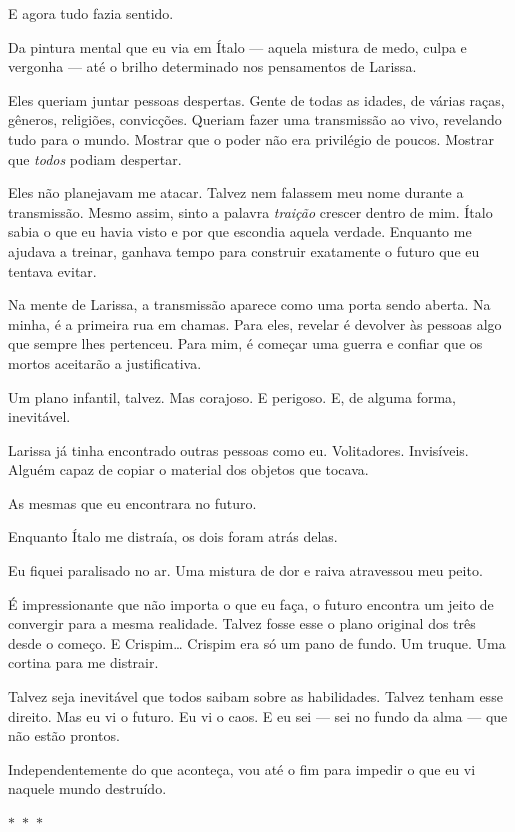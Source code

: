 E agora tudo fazia sentido.

Da pintura mental que eu via em Ítalo — aquela mistura de medo, culpa e vergonha — até o brilho determinado nos pensamentos de Larissa.

Eles queriam juntar pessoas despertas.  
Gente de todas as idades, de várias raças, gêneros, religiões, convicções.  
Queriam fazer uma transmissão ao vivo, revelando tudo para o mundo.  
Mostrar que o poder não era privilégio de poucos.  
Mostrar que \emph{todos} podiam despertar.

Eles não planejavam me atacar. Talvez nem falassem meu nome durante a transmissão. Mesmo assim, sinto a palavra \emph{traição} crescer dentro de mim. Ítalo sabia o que eu havia visto e por que escondia aquela verdade. Enquanto me ajudava a treinar, ganhava tempo para construir exatamente o futuro que eu tentava evitar.

Na mente de Larissa, a transmissão aparece como uma porta sendo aberta. Na minha, é a primeira rua em chamas. Para eles, revelar é devolver às pessoas algo que sempre lhes pertenceu. Para mim, é começar uma guerra e confiar que os mortos aceitarão a justificativa.

Um plano infantil, talvez.  
Mas corajoso.  
E perigoso.  
E, de alguma forma, inevitável.

Larissa já tinha encontrado outras pessoas como eu.  
Volitadores.  
Invisíveis.  
Alguém capaz de copiar o material dos objetos que tocava.

As mesmas que eu encontrara no futuro.

Enquanto Ítalo me distraía, os dois foram atrás delas.

Eu fiquei paralisado no ar.  
Uma mistura de dor e raiva atravessou meu peito.

É impressionante que não importa o que eu faça, o futuro encontra um jeito de convergir para a mesma realidade.  
Talvez fosse esse o plano original dos três desde o começo.  
E Crispim… Crispim era só um pano de fundo.  
Um truque.  
Uma cortina para me distrair.

Talvez seja inevitável que todos saibam sobre as habilidades.  
Talvez tenham esse direito.  
Mas eu vi o futuro.  
Eu vi o caos.  
E eu sei — sei no fundo da alma — que não estão prontos.

Independentemente do que aconteça, vou até o fim para impedir o que eu vi naquele mundo destruído.

\begin{center}
$\ast$~$\ast$~$\ast$
\end{center}


